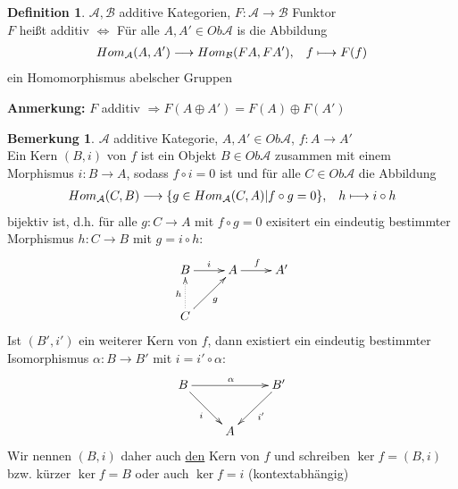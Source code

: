 \documentclass[10pt,a4paper,numbers=endperiod]{scrreprt}
\theoremstyle{definition}
\newtheorem{defi}[satz]{Definition}
\newtheorem{bem}[satz]{Bemerkung}
\begin{document}
\begin{defi}
	$\mathcal{A}, \mathcal{B}$ additive Kategorien, $F: \mathcal{A} \to \mathcal{B}$ Funktor\\
	$F$ heißt additiv $\Leftrightarrow$ Für alle $A, A' \in Ob \mathcal{A}$ is die Abbildung \begin{align*}
		Hom_\mathcal{A} (A, A') \longrightarrow Hom_\mathcal{B} (FA, FA'), \hspace*{3mm} f \longmapsto F(f)
	\end{align*}
	ein Homomorphismus abelscher Gruppen
\end{defi}

\textbf{Anmerkung:} $F$ additiv $\Rightarrow F(A \oplus A') = F(A) \oplus F(A')$ 

\begin{bem}
$\mathcal{A}$ additive Kategorie, $A, A' \in Ob \mathcal{A}$, $f: A \to A'$\\
Ein Kern $(B, i)$ von $f$ ist ein Objekt $B \in Ob \mathcal{A}$ zusammen mit einem Morphismus $i: B \to  A$, sodass $f \circ i = 0$ ist und für alle $C \in Ob \mathcal{A}$ die Abbildung \begin{align*}
 Hom _\mathcal{A} (C, B) \longrightarrow \{ g \in Hom _\mathcal{A} (C, A) | f \circ g = 0 \}, \hspace*{3mm} h \longmapsto i \circ h
\end{align*}
bijektiv ist, d.h. für alle $g: C \to A$ mit $f \circ g = 0$ exisitert ein eindeutig bestimmter Morphismus $h: C \to B$ mit $g = i \circ h$: \begin{align*}
	\begin{xy}
		\xymatrix{
					B \ar[r]^i & A \ar[r]^f & A'\\
					C \ar@{.>}[u]^h \ar[ur]_g & &	
	}
	\end{xy}
\end{align*}
Ist $(B', i')$ ein weiterer Kern von $f$, dann existiert ein eindeutig bestimmter Isomorphismus $\alpha: B \to B'$ mit $i = i' \circ \alpha$: \begin{align*}
	\begin{xy}
		\xymatrix{
					B \ar[rr]^\alpha \ar[dr]_{i} & & B' \ar[dl]^{i'}\\
					& A &
				 }
	\end{xy}
\end{align*}
Wir nennen $(B, i)$ daher auch \underline{den} Kern von $f$ und schreiben $\ker f = (B, i)$ bzw. kürzer $\ker f = B$ oder auch $\ker f = i$ (kontextabhängig)
\end{bem}
\end{document}
